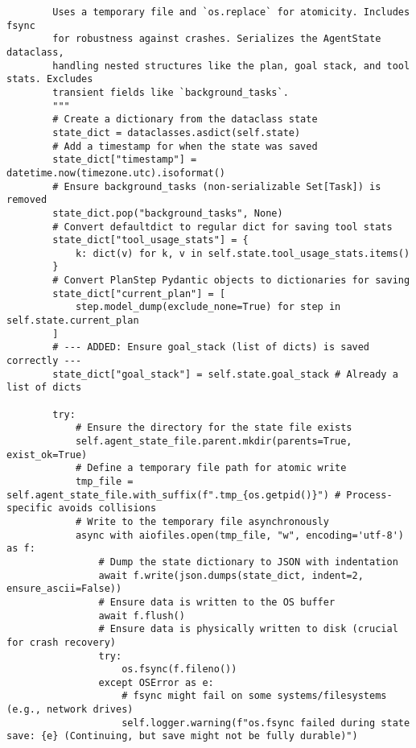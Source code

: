 \documentclass[12pt,a4paper]{article}
\begin{document}
\begin{pageablecode}
\begin{verbatim}
        Uses a temporary file and `os.replace` for atomicity. Includes fsync
        for robustness against crashes. Serializes the AgentState dataclass,
        handling nested structures like the plan, goal stack, and tool stats. Excludes
        transient fields like `background_tasks`.
        """
        # Create a dictionary from the dataclass state
        state_dict = dataclasses.asdict(self.state)
        # Add a timestamp for when the state was saved
        state_dict["timestamp"] = datetime.now(timezone.utc).isoformat()
        # Ensure background_tasks (non-serializable Set[Task]) is removed
        state_dict.pop("background_tasks", None)
        # Convert defaultdict to regular dict for saving tool stats
        state_dict["tool_usage_stats"] = {
            k: dict(v) for k, v in self.state.tool_usage_stats.items()
        }
        # Convert PlanStep Pydantic objects to dictionaries for saving
        state_dict["current_plan"] = [
            step.model_dump(exclude_none=True) for step in self.state.current_plan
        ]
        # --- ADDED: Ensure goal_stack (list of dicts) is saved correctly ---
        state_dict["goal_stack"] = self.state.goal_stack # Already a list of dicts

        try:
            # Ensure the directory for the state file exists
            self.agent_state_file.parent.mkdir(parents=True, exist_ok=True)
            # Define a temporary file path for atomic write
            tmp_file = self.agent_state_file.with_suffix(f".tmp_{os.getpid()}") # Process-specific avoids collisions
            # Write to the temporary file asynchronously
            async with aiofiles.open(tmp_file, "w", encoding='utf-8') as f:
                # Dump the state dictionary to JSON with indentation
                await f.write(json.dumps(state_dict, indent=2, ensure_ascii=False))
                # Ensure data is written to the OS buffer
                await f.flush()
                # Ensure data is physically written to disk (crucial for crash recovery)
                try:
                    os.fsync(f.fileno())
                except OSError as e:
                    # fsync might fail on some systems/filesystems (e.g., network drives)
                    self.logger.warning(f"os.fsync failed during state save: {e} (Continuing, but save might not be fully durable)")


\end{verbatim}
\end{pageablecode}
\end{document}
